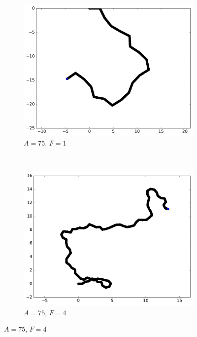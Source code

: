 \begin{appendices}
	
	
	
	
	\begin{figure}[htbp]
		\begin{subfigure}[t]{\subImgWmo}
			\centering
			\includegraphics[width=\textwidth]{figures/ch3/synTraj_219_75_1}
			\caption[$A = 75$, $F=1$]{$A = 75$, $F=1$}
			\label{fig:synTraj_219_75_1}
		\end{subfigure}
		~
		\begin{subfigure}[t]{\subImgWmo}
			\centering
			\includegraphics[width=\textwidth]{figures/ch3/synTraj_219_75_4}
			\caption[$A = 75$, $F=4$]{$A = 75$, $F=4$}
			\label{fig:synTraj_219_75_4}

\end{subfigure}
\end{figure}
\end{appendices}
